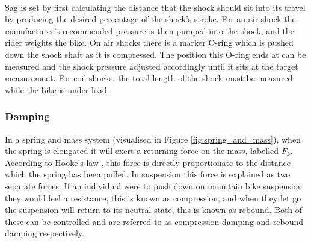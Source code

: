 		\\
		Sag is set by first calculating the distance that the shock should sit into its travel by producing the desired percentage of the shock's stroke. For an air shock the manufacturer's recommended pressure is then pumped into the shock, and the rider weights the bike. On air shocks there is a marker O-ring which is pushed down the shock shaft as it is compressed. The position this O-ring ends at can be measured and the shock pressure adjusted accordingly until it sits at the target measurement. For coil shocks, the total length of the shock must be measured while the bike is under load. 
	\subsubsection{Damping}
		In a spring and mass system (visualised in Figure \ref{fig:spring_and_mass}), when the spring is elongated it will exert a returning force on the mass, labelled $F_k$. According to Hooke's law \citep{rychlewski1984hooke}, this force is directly proportionate to the distance which the spring has been pulled. In suspension this force is explained as two separate forces. If an individual were to push down on mountain bike suspension they would feel a resistance, this is known as compression, and when they let go the suspension will return to its neutral state, this is known as rebound. Both of these can be controlled and are referred to as compression damping and rebound damping respectively.

